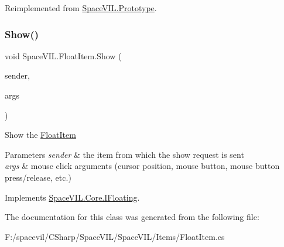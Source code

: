 Reimplemented from \mbox{\hyperlink{class_space_v_i_l_1_1_prototype_af063fd80d51a3c42c8f43e0e97b6b809}{Space\+V\+I\+L.\+Prototype}}.

\mbox{\label{class_space_v_i_l_1_1_float_item_a7b352daad024029b2816939c0736aa66}} 
\subsubsection{\texorpdfstring{Show()}{Show()}}
{\footnotesize\ttfamily void Space\+V\+I\+L.\+Float\+Item.\+Show (\begin{DoxyParamCaption}\item[{\mbox{\hyperlink{interface_space_v_i_l_1_1_core_1_1_i_item}{I\+Item}}}]{sender,  }\item[{\mbox{\hyperlink{class_space_v_i_l_1_1_core_1_1_mouse_args}{Mouse\+Args}}}]{args }\end{DoxyParamCaption})\hspace{0.3cm}{\ttfamily [inline]}}



Show the \mbox{\hyperlink{class_space_v_i_l_1_1_float_item}{Float\+Item}} 


\begin{DoxyParams}{Parameters}
{\em sender} & the item from which the show request is sent \\
\hline
{\em args} & mouse click arguments (cursor position, mouse button, mouse button press/release, etc.) \\
\hline
\end{DoxyParams}


Implements \mbox{\hyperlink{interface_space_v_i_l_1_1_core_1_1_i_floating}{Space\+V\+I\+L.\+Core.\+I\+Floating}}.



The documentation for this class was generated from the following file\+:\begin{DoxyCompactItemize}
\item 
F\+:/spacevil/\+C\+Sharp/\+Space\+V\+I\+L/\+Space\+V\+I\+L/\+Items/Float\+Item.\+cs\end{DoxyCompactItemize}
